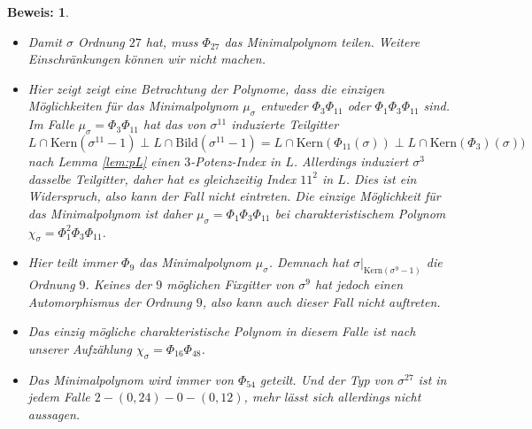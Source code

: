\documentclass[12pt,a4paper,halfparskip,headsepline,bibtotocnumbered]{scrreprt}
\theoremstyle{nummermitklammern}
\theoremstyle{nonumberbreak}
\newtheorem{beweis}{Beweis:}
\newcommand{\Kern}{\text{Kern}}
\newcommand{\Bild}{\text{Bild}}
\begin{document}
\begin{beweis}
	\begin{itemize}[align=left, leftmargin = *]
		\item[$m = 27 = 3^3$:] Damit $\sigma$ Ordnung $27$ hat, muss $\Phi_{27}$ das Minimalpolynom teilen. Weitere Einschränkungen können wir nicht machen.
		\item[$m = 33 = 3 \cdot 11$:] Hier zeigt zeigt eine Betrachtung der Polynome, dass die einzigen Möglichkeiten für das Minimalpolynom $\mu_\sigma$ entweder $\Phi_3 \Phi_{11}$ oder $\Phi_1 \Phi_3 \Phi_{11}$ sind. Im Falle $\mu_\sigma = \Phi_3 \Phi_{11}$ hat das von $\sigma^{11}$ induzierte Teilgitter
	\[L \cap \Kern(\sigma^{11}-1) \perp L \cap \Bild(\sigma^{11}-1) = L \cap \Kern(\Phi_{11}(\sigma)) \perp L \cap \Kern(\Phi_3)(\sigma)) \]
	nach Lemma \eqref{lem:pL} einen $3$-Potenz-Index in $L$. Allerdings induziert $\sigma^3$ dasselbe Teilgitter, daher hat es gleichzeitig Index $11^2$ in $L$. Dies ist ein Widerspruch, also kann der Fall nicht eintreten. Die einzige Möglichkeit für das Minimalpolynom ist daher $\mu_\sigma = \Phi_1 \Phi_3 \Phi_{11}$ bei charakteristischem Polynom $\chi_\sigma = \Phi_1^2 \Phi_3 \Phi_{11}$.
		\item[$m = 45 = 3^2 \cdot 5$.] Hier teilt immer $\Phi_9$ das Minimalpolynom $\mu_\sigma$. Demnach hat $\sigma\vert_{\Kern(\sigma^9-1)}$ die Ordnung $9$. Keines der $9$ möglichen Fixgitter von $\sigma^9$ hat jedoch einen Automorphismus der Ordnung $9$, also kann auch dieser Fall nicht auftreten.
		\item[$m = 48 = 2^4 \cdot 3$:] Das einzig mögliche charakteristische Polynom in diesem Falle ist nach unserer Aufzählung $\chi_\sigma = \Phi_{16} \Phi_{48}$.
		\item[$m = 54 = 2 \cdot 3^3$:] Das Minimalpolynom wird immer von $\Phi_{54}$ geteilt. Und der Typ von $\sigma^{27}$ ist in jedem Falle $2 - (0, 24) - 0 - (0, 12)$, mehr lässt sich allerdings nicht aussagen.

\end{itemize}
\end{beweis}
\end{document}
